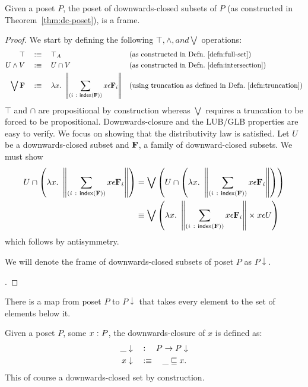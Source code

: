 \begin{thm}\label{thm:down-set-frame}
  Given a poset $P$, the poset of downwards-closed subsets of $P$ (as constructed in
  Theorem~\ref{thm:dc-poset}), is a frame.
\end{thm}
\begin{proof}
  We start by defining the following $\top, \wedge, and \bigvee$ operations:
  \begin{align*}
    \top       \quad&:\equiv\quad \top_A   && \text{(as constructed in Defn.~\ref{defn:full-set})} \\
    U \wedge V   \quad&:\equiv\quad U \cap V && \text{(as constructed in Defn.~\ref{defn:intersection})}\\
    \bigvee \mathbf{F}{} \quad&:\equiv\quad \lambda x.~ \left\| \sum_{(i~:~\mathsf{index}{}\left(\mathbf{F}{}\right))} x \epsilon \mathbf{F}{}_i \right\|
                         && \text{(using truncation as defined in Defn.~\ref{defn:truncation})}
  \end{align*}
  $\top$ and $\cap$ are propositional by construction whereas $\bigvee$ requires a truncation to be
  forced to be propositional. Downwards-closure and the LUB/GLB properties are easy to
  verify. We focus on showing that the distributivity law is satisfied. Let $U$ be a
  downwards-closed subset and $\mathbf{F}{}$, a family of downward-closed subsets. We must show
  \begin{align*}
    U \cap \left(\lambda x.~ \left\| \sum_{(i~:~\mathsf{index}{}\left(\mathbf{F}{}\right))} x \epsilon \mathbf{F}{}_i \right\|\right)
      &= \bigvee \left( U \cap \left( \lambda x.~ \left\| \sum_{(i~:~\mathsf{index}{}\left(\mathbf{F}{}\right))} x \epsilon \mathbf{F}{}_i \right\|\right) \right)\\
      &\equiv \bigvee \left( \lambda x.~ \left\| \sum_{(i~:~\mathsf{index}{}\left(\mathbf{F}{}\right))} x \epsilon \mathbf{F}{}_i \right\| \times x \epsilon U \right)
  \end{align*}
  which follows by antisymmetry.

  We will denote the frame of downwards-closed subsets of poset $P$ as $P\downarrow$.

  .
\end{proof}

There is a map from poset $P$ to $P\downarrow$ that takes every element to the set of elements
below it.

\begin{defn}\label{defn:down-clos}
  Given a poset $P$, some $x\hspace{0.1mm}:\hspace{0.1mm}P$, the downwards-closure of $x$ is defined as:
  \begin{align*}
    \_\downarrow \quad&:\quad P \rightarrow P\downarrow                   \\
    x\downarrow  \quad&:\equiv\quad \_ \sqsubseteq x  .
  \end{align*}
  This of course a downwards-closed set by construction.
\end{defn}

